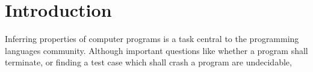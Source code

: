 \section{Introduction}
\label{sec:introduction}
Inferring properties of computer programs is a task central to the programming languages community. Although important questions like whether a program shall terminate, or finding a test case which shall crash a program are undecidable, 